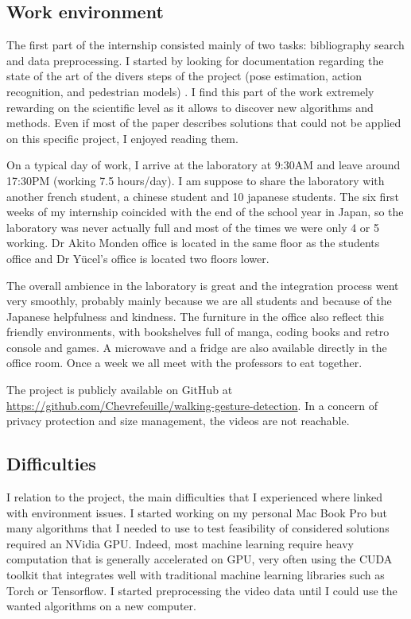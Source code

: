 \documentclass[12pt,a4paper,twoside]{article}
\begin{document}
\subsection{Work environment}
The first part of the internship consisted mainly of two tasks: bibliography search and data preprocessing. I started by looking for documentation regarding the state of the art of the divers steps of the project (pose estimation, action recognition, and pedestrian models)
. I find this part of the work extremely rewarding on the scientific level as it allows to discover new algorithms and methods. Even if most of the paper describes solutions that could not be applied on this specific project, I enjoyed reading them.

On a typical day of work, I arrive at the laboratory at 9:30AM and leave around 17:30PM (working 7.5 hours/day). I am suppose to share the laboratory with another french student, a chinese student and 10 japanese students. The six first weeks of my internship coincided with the end of the school year in Japan, so the laboratory was never actually full and most of the times we were only 4 or 5 working. Dr Akito Monden office is located in the same floor as the students office and Dr Yücel's office is located two floors lower. 

The overall ambience in the laboratory is great and the integration process went very smoothly, probably mainly because we are all students and because of the Japanese helpfulness and kindness. The furniture in the office also reflect this friendly environments, with bookshelves full of manga, coding books and retro console and games. A microwave and a fridge are also available directly in the office room. Once a week we all meet with the professors to eat together.

The project is publicly available on GitHub at \url{https://github.com/Chevrefeuille/walking-gesture-detection}. In a concern of privacy protection and size management, the videos are not reachable.

\subsection{Difficulties}
I relation to the project, the main difficulties that I experienced where linked with environment issues. I started working on my personal Mac Book Pro but many algorithms that I needed to use to test feasibility of considered solutions required an NVidia GPU. Indeed, most machine learning require heavy computation that is generally accelerated on GPU, very often using the CUDA toolkit that integrates well with traditional machine learning libraries such as Torch or Tensorflow. I started preprocessing the video data until I could use the wanted algorithms on a new computer.
\end{document}
